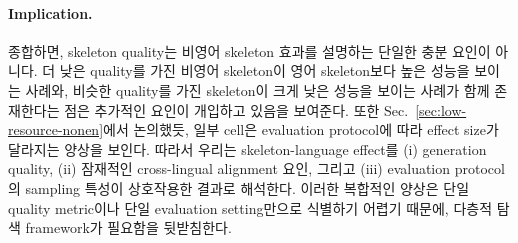 \paragraph{Implication.}
종합하면, skeleton quality는 비영어 skeleton 효과를 설명하는 단일한 충분 요인이 아니다. 더 낮은 quality를 가진 비영어 skeleton이 영어 skeleton보다 높은 성능을 보이는 사례와, 비슷한 quality를 가진 skeleton이 크게 낮은 성능을 보이는 사례가 함께 존재한다는 점은 추가적인 요인이 개입하고 있음을 보여준다. 또한 Sec.~\ref{sec:low-resource-nonen}에서 논의했듯, 일부 cell은 evaluation protocol에 따라 effect size가 달라지는 양상을 보인다. 따라서 우리는 skeleton-language effect를 (i) generation quality, (ii) 잠재적인 cross-lingual alignment 요인, 그리고 (iii) evaluation protocol의 sampling 특성이 상호작용한 결과로 해석한다. 이러한 복합적인 양상은 단일 quality metric이나 단일 evaluation setting만으로 식별하기 어렵기 때문에,  다층적 탐색 framework가 필요함을 뒷받침한다.